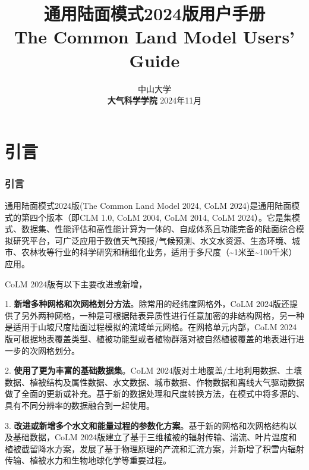 \documentclass[a4paper,12pt,twoside]{article}
\begin{document}
\title{\huge {\bf 通用陆面模式2024版用户手册}\\
\vspace{6mm}
\fontsize {22}{24}
\bf{ The Common Land Model Users' Guide}
\fontsize {20}{23}
 \vskip 2in
}

\author{
 \large{ 中山大学 }\\[2ex]
 {\bf 大气科学学院}
 \vskip 2in
 \upshape
 \large
 \vskip 0.5in
 2024年11月
}

\normallinespacing
\maketitle

\preface

\clearpage 
\pagestyle{fancy}

\tableofcontents
\clearpage
{}

\part{引言}
\section{引言}

通用陆面模式2024版(The Common Land Model 2024, CoLM 2024)是通用陆面模式的第四个版本（即CLM 1.0, CoLM 2004, CoLM 2014, CoLM 2024）。它是集模式、数据集、性能评估和高性能计算为一体的、自成体系且功能完备的陆面综合模拟研究平台，可广泛应用于数值天气预报/气候预测、水文水资源、生态环境、城市、农林牧等行业的科学研究和精细化业务，适用于多尺度（\textasciitilde 1米至\textasciitilde 100千米）应用。

CoLM 2024版有以下主要改进或新增，

1. \textbf{新增多种网格和次网格划分方法}。除常用的经纬度网格外，CoLM 2024版还提供了另外两种网格，一种是可根据陆表异质性进行任意加密的非结构网格，另一种是适用于山坡尺度陆面过程模拟的流域单元网格。在网格单元内部，CoLM 2024版可根据地表覆盖类型、植被功能型或者植物群落对被自然植被覆盖的地表进行进一步的次网格划分。

2. \textbf{使用了更为丰富的基础数据集}。CoLM 2024版对土地覆盖/土地利用数据、土壤数据、植被结构及属性数据、水文数据、城市数据、作物数据和离线大气驱动数据做了全面的更新或补充。基于新的数据处理和尺度转换方法，在模式中将多源的、具有不同分辨率的数据融合到一起使用。

3. \textbf{改进或新增多个水文和能量过程的参数化方案}。基于新的网格和次网格结构以及基础数据，CoLM 2024版建立了基于三维植被的辐射传输、湍流、叶片温度和植被截留降水方案，发展了基于物理原理的产流和汇流方案，并新增了积雪内辐射传输、植被水力和生物地球化学等重要过程。
\end{document}
